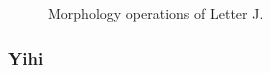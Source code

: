 \documentclass[paper=a4, fontsize=11pt]{scrartcl}
\numberwithin{equation}{section}		%
\numberwithin{figure}{section}			%
\numberwithin{table}{section}				%
\begin{document}
\begin{figure}
{\label{fig:j_open} }
\caption{Morphology operations of Letter J.}\label{fig:j_letter}
\end{figure}

\subsubsection{Yihi}
\end{document}
